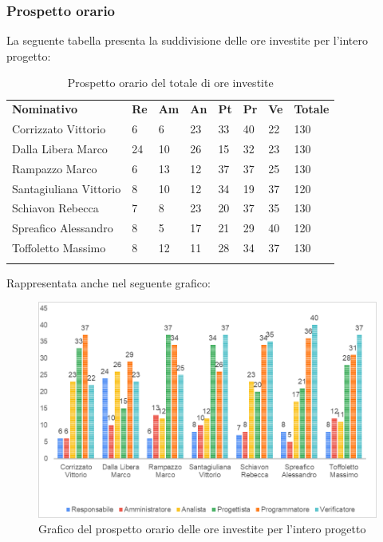\subsubsection{Prospetto orario}
La seguente tabella presenta la suddivisione delle ore investite per l'intero progetto\glo:
\begin{longtable} {				
		>{}p{40mm}  
		>{}p{8mm}
		>{}p{8mm}
		>{}p{8mm}
		>{}p{8mm}
		>{}p{8mm}
		>{}p{8mm}
		>{}p{12mm}			
	}			
	\rowcolor{gray!50}
	\textbf{Nominativo} & \textbf{Re} & \textbf{Am} & \textbf{An} & \textbf{Pt} & \textbf{Pr} & \textbf{Ve} & \textbf{Totale}	\TBstrut \\ [2mm]
	Corrizzato Vittorio & 6 & 6 & 23 & 33 & 40 & 22 & 130 \TBstrut \\ [2mm]
	Dalla Libera Marco & 24 & 10 & 26 & 15 & 32 & 23 & 130 \TBstrut \\ [2mm]
	Rampazzo Marco & 6 & 13 & 12 & 37 & 37 & 25 & 130 \TBstrut \\ [2mm]
	Santagiuliana Vittorio & 8 & 10 & 12 & 34 & 19 & 37 & 120 \TBstrut \\ [2mm]
	Schiavon Rebecca & 7 & 8 & 23 & 20 & 37 & 35 & 130 \TBstrut \\ [2mm]
	Spreafico Alessandro & 8 & 5 & 17 & 21 & 29 & 40 & 120 \TBstrut \\ [2mm]
	Toffoletto Massimo & 8 & 12 & 11 & 28 & 34 & 37 & 130 \TBstrut \\ [2mm]
	\rowcolor{white}
	\caption{Prospetto orario del totale di ore investite}
\end{longtable}
\pagebreak
Rappresentata anche nel seguente grafico:
\begin{figure} [H]
	\includegraphics[width=\linewidth]{./img/Grafici/9.png}
	\caption{Grafico del prospetto orario delle ore investite per l'intero progetto\glo}
\end{figure}

